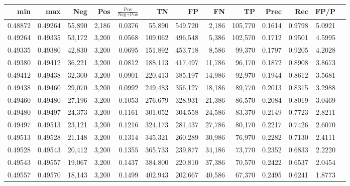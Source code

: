\begin{tabular}{rrrrrrrrrrrrr}
\toprule
    min &     max &    Neg &   Pos & $\frac{\text{Pos}}{\text{Neg}+\text{Pos}}$ &      TN &      FP &      FN &      TP &   Prec &    Rec &   FP/P \\
\midrule
0.48872 & 0.49264 & 55,890 & 2,186 &                                     0.0376 &  55,890 & 549,720 &   2,186 & 105,770 & 0.1614 & 0.9798 & 5.0921 \\
0.49264 & 0.49335 & 53,172 & 3,200 &                                     0.0568 & 109,062 & 496,548 &   5,386 & 102,570 & 0.1712 & 0.9501 & 4.5995 \\
0.49335 & 0.49380 & 42,830 & 3,200 &                                     0.0695 & 151,892 & 453,718 &   8,586 &  99,370 & 0.1797 & 0.9205 & 4.2028 \\
0.49380 & 0.49412 & 36,221 & 3,200 &                                     0.0812 & 188,113 & 417,497 &  11,786 &  96,170 & 0.1872 & 0.8908 & 3.8673 \\
0.49412 & 0.49438 & 32,300 & 3,200 &                                     0.0901 & 220,413 & 385,197 &  14,986 &  92,970 & 0.1944 & 0.8612 & 3.5681 \\
0.49438 & 0.49460 & 29,070 & 3,200 &                                     0.0992 & 249,483 & 356,127 &  18,186 &  89,770 & 0.2013 & 0.8315 & 3.2988 \\
0.49460 & 0.49480 & 27,196 & 3,200 &                                     0.1053 & 276,679 & 328,931 &  21,386 &  86,570 & 0.2084 & 0.8019 & 3.0469 \\
0.49480 & 0.49497 & 24,373 & 3,200 &                                     0.1161 & 301,052 & 304,558 &  24,586 &  83,370 & 0.2149 & 0.7723 & 2.8211 \\
0.49497 & 0.49513 & 23,121 & 3,200 &                                     0.1216 & 324,173 & 281,437 &  27,786 &  80,170 & 0.2217 & 0.7426 & 2.6070 \\
0.49513 & 0.49528 & 21,148 & 3,200 &                                     0.1314 & 345,321 & 260,289 &  30,986 &  76,970 & 0.2282 & 0.7130 & 2.4111 \\
0.49528 & 0.49543 & 20,412 & 3,200 &                                     0.1355 & 365,733 & 239,877 &  34,186 &  73,770 & 0.2352 & 0.6833 & 2.2220 \\
0.49543 & 0.49557 & 19,067 & 3,200 &                                     0.1437 & 384,800 & 220,810 &  37,386 &  70,570 & 0.2422 & 0.6537 & 2.0454 \\
0.49557 & 0.49570 & 18,143 & 3,200 &                                     0.1499 & 402,943 & 202,667 &  40,586 &  67,370 & 0.2495 & 0.6241 & 1.8773 \\

\end{tabular}
